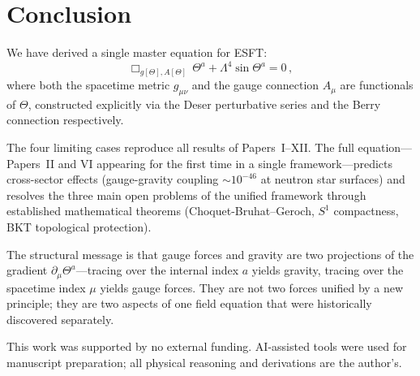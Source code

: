 \documentclass[twocolumn,preprintnumbers,amsmath,amssymb,prd]{revtex4-2}
\begin{document}
\section{Conclusion}
\label{sec:conclusion}

We have derived a single master equation for ESFT:
\begin{equation}
\Box_{g[\Theta],A[\Theta]}\,\Theta^a + \Lambda^4\sin\Theta^a = 0\,,
\end{equation}
where both the spacetime metric $g_{\mu\nu}$ and the gauge connection $A_\mu$ are functionals of $\Theta$, constructed explicitly via the Deser perturbative series and the Berry connection respectively.

The four limiting cases reproduce all results of Papers~I--XII.
The full equation---Papers~II and VI appearing for the first time in a single framework---predicts cross-sector effects (gauge-gravity coupling $\sim 10^{-46}$ at neutron star surfaces) and resolves the three main open problems of the unified framework through established mathematical theorems (Choquet-Bruhat--Geroch, $S^1$ compactness, BKT topological protection).

The structural message is that gauge forces and gravity are two projections of the gradient $\partial_\mu\Theta^a$---tracing over the internal index $a$ yields gravity, tracing over the spacetime index $\mu$ yields gauge forces.
They are not two forces unified by a new principle; they are two aspects of one field equation that were historically discovered separately.

\begin{acknowledgments}
This work was supported by no external funding.
AI-assisted tools were used for manuscript preparation; all physical reasoning and derivations are the author's.
\end{acknowledgments}
\end{document}
